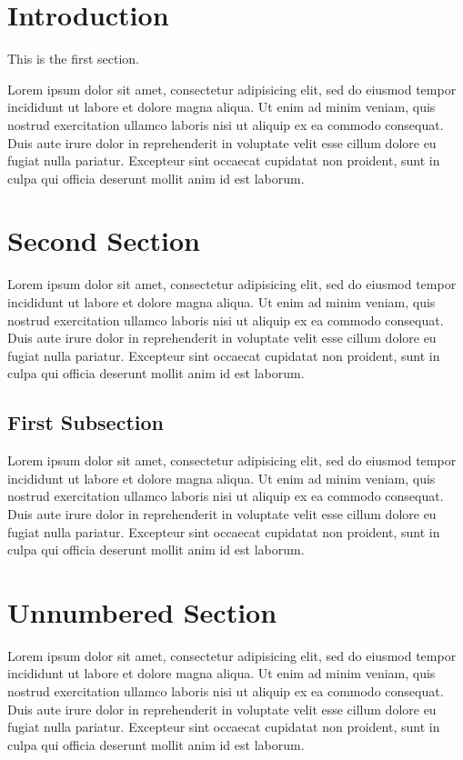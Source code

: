 \documentclass{report}
\begin{document}
\section{Introduction}

This is the first section.

Lorem ipsum dolor sit amet, consectetur adipisicing elit, sed do eiusmod tempor incididunt ut labore et dolore magna aliqua. Ut enim ad minim veniam, quis nostrud exercitation ullamco laboris nisi ut aliquip ex ea commodo consequat. Duis aute irure dolor in reprehenderit in voluptate velit esse cillum dolore eu fugiat nulla pariatur. Excepteur sint occaecat cupidatat non proident, sunt in culpa qui officia deserunt mollit anim id est laborum.

\section{Second Section}
Lorem ipsum dolor sit amet, consectetur adipisicing elit, sed do eiusmod
tempor incididunt ut labore et dolore magna aliqua. Ut enim ad minim veniam,
quis nostrud exercitation ullamco laboris nisi ut aliquip ex ea commodo
consequat. Duis aute irure dolor in reprehenderit in voluptate velit esse
cillum dolore eu fugiat nulla pariatur. Excepteur sint occaecat cupidatat non
proident, sunt in culpa qui officia deserunt mollit anim id est laborum.

\subsection{First Subsection}
Lorem ipsum dolor sit amet, consectetur adipisicing elit, sed do eiusmod
tempor incididunt ut labore et dolore magna aliqua. Ut enim ad minim veniam,
quis nostrud exercitation ullamco laboris nisi ut aliquip ex ea commodo
consequat. Duis aute irure dolor in reprehenderit in voluptate velit esse
cillum dolore eu fugiat nulla pariatur. Excepteur sint occaecat cupidatat non
proident, sunt in culpa qui officia deserunt mollit anim id est laborum.

\section*{Unnumbered Section}
Lorem ipsum dolor sit amet, consectetur adipisicing elit, sed do eiusmod
tempor incididunt ut labore et dolore magna aliqua. Ut enim ad minim veniam,
quis nostrud exercitation ullamco laboris nisi ut aliquip ex ea commodo
consequat. Duis aute irure dolor in reprehenderit in voluptate velit esse
cillum dolore eu fugiat nulla pariatur. Excepteur sint occaecat cupidatat non
proident, sunt in culpa qui officia deserunt mollit anim id est laborum.
\end{document}
